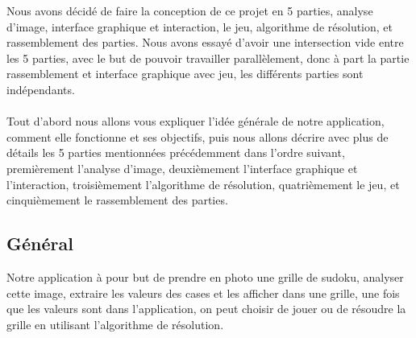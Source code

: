\documentclass{article}
\begin{document}
Nous avons décidé de faire la conception de ce projet en 5 parties, analyse d'image, interface graphique et interaction, le jeu, algorithme de résolution, et rassemblement des parties. Nous avons essayé d'avoir une intersection vide entre les 5 parties, avec le but de pouvoir travailler parallèlement, donc à part la partie rassemblement et interface graphique avec jeu, les différents parties sont indépendants. 
\\
\\
Tout d'abord nous allons vous expliquer l'idée générale de notre application, comment elle fonctionne et ses objectifs, puis nous allons décrire avec plus de détails les 5 parties mentionnées précédemment dans l'ordre suivant, premièrement l'analyse d'image, deuxièmement l'interface graphique et l'interaction, troisièmement l'algorithme de résolution, quatrièmement le jeu, et cinquièmement le rassemblement des parties.




\subsection{Général}

Notre application à pour but de prendre en photo une grille de sudoku, analyser cette image, extraire les valeurs des cases et les afficher dans une grille, une fois que les valeurs sont dans l’application, on peut choisir de jouer ou de résoudre la grille en utilisant l’algorithme de résolution.\\
\end{document}

